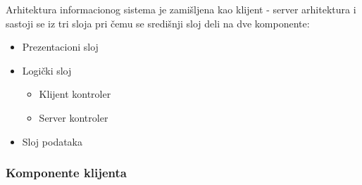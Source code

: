 \documentclass[20pt]{article}
\begin{document}
 Arhitektura informacionog sistema je zami\v {s}ljena kao klijent - server arhitektura i sastoji se iz tri sloja pri \v {c}emu se sredi\v {s}nji sloj deli na dve komponente: 
 \begin{itemize}
    \item Prezentacioni sloj
    \item Logi\v {c}ki sloj
    \begin{itemize}
        \item Klijent kontroler 
        \item Server kontroler
    \end{itemize}
    \item Sloj podataka
\end{itemize}
 
 
\subsubsection{\bfseries \Large Komponente klijenta }
\setlength{\parindent}{1cm}
\fontsize{13}{18} \selectfont 
\end{document}

